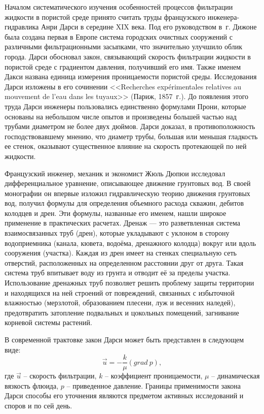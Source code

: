Началом систематического изучения особенностей процессов фильтрации жидкости в пористой среде принято считать труды французского инженера-гидравлика Анри Дарси в середине XIX века.
Под его руководством в~г. Дижоне была создана первая в Европе система городских очистных сооружений с различными фильтрационными засыпками, что значительно улучшило облик города.
Дарси обосновал закон, связывающий скорость фильтрации жидкости в пористой среде с градиентом давления, получивший его имя. Также именем Дакси названа единица измерения проницаемости пористой среды.
Исследования Дарси изложены в его сочинении <<Recherches expérimentales relatives au mouvement de l’eau dans les tuyaux>> (Париж, 1857~г.).
До появления этого труда Дарси инженеры пользовались единственно формулами Прони, которые основаны на небольшом числе опытов и произведены большей частью над трубами диаметром не более двух дюймов.
Дарси доказал, в противоположность господствовавшему мнению, что диаметр трубы, большая или меньшая гладкость ее стенок, оказывают существенное влияние на скорость протекающей по ней жидкости.

Французский инженер, механик и экономист Жюль Дюпюи исследовал дифференциальное уравнение, описывающее движение грунтовых вод. В своей монографии он впервые изложил гидравлическую теорию движения грунтовых вод,
получил формулы для определения объемного расхода скважин, дебитов колодцев и дрен. Эти формулы, названные его именем, нашли широкое применение в практических расчетах. Дренаж — это разветвленная система взаимосвязанных труб (дрен),
которые укладывают с уклоном в сторону водоприемника (канала, кювета, водоёма, дренажного колодца) вокруг или вдоль сооружения (участка). Каждая из дрен имеет на стенках специальную сеть отверстий, расположенных на 
определенном расстоянии друг от друга. Такая система труб впитывает воду из грунта и отводит её за пределы участка. Использование дренажных труб позволяет решить проблему защиты территории и находящихся на ней строений от 
повреждений, связанных с избыточной влажностью (мерзлотой, образованием плесени, луж и весенних наледей), предотвратить затопление подвальных и цокольных помещений, загнивание корневой системы растений.

В современной трактовке закон Дарси может быть представлен в следующем виде:
\begin{equation}
\label{Darcy}
  \overrightarrow{u}=-\frac{k}{\mu}(grad \ p),
\end{equation}
где $\overrightarrow{u}$ -- скорость фильтрации, $k$ -- коэффициент проницаемости, $\mu$ -- динамическая вязкость флюида, $p$ -- приведенное давление.
Границы применимости закона Дарси способы его уточнения являются предметом активных исследований и споров и по сей день.


